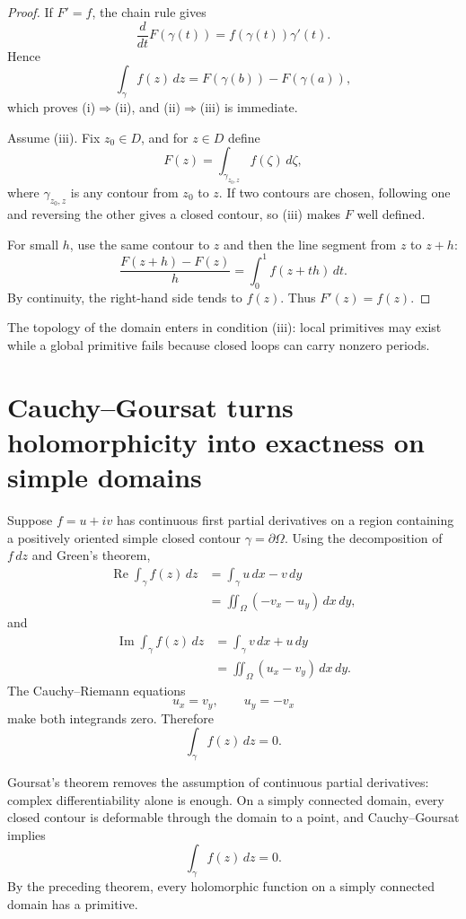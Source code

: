 \begin{proof}
If \(F'=f\), the chain rule gives
\[
  \frac{d}{dt}F(\gamma(t))
  =f(\gamma(t))\gamma'(t).
\]
Hence
\[
  \int_\gamma f(z)\,dz
  =F(\gamma(b))-F(\gamma(a)),
\]
which proves (i)\(\Rightarrow\)(ii), and (ii)\(\Rightarrow\)(iii) is immediate.

Assume (iii).  Fix \(z_0\in D\), and for \(z\in D\) define
\[
  F(z)=\int_{\gamma_{z_0,z}}f(\zeta)\,d\zeta,
\]
where \(\gamma_{z_0,z}\) is any contour from \(z_0\) to \(z\).  If two contours are chosen, following one and reversing the other gives a closed contour, so (iii) makes \(F\) well defined.

For small \(h\), use the same contour to \(z\) and then the line segment from \(z\) to \(z+h\):
\[
  \frac{F(z+h)-F(z)}{h}
  =\int_0^1 f(z+th)\,dt.
\]
By continuity, the right-hand side tends to \(f(z)\).  Thus \(F'(z)=f(z)\).
\end{proof}

The topology of the domain enters in condition (iii): local primitives may exist while a global primitive fails because closed loops can carry nonzero periods.

\section{Cauchy--Goursat turns holomorphicity into exactness on simple domains}

Suppose \(f=u+iv\) has continuous first partial derivatives on a region containing a positively oriented simple closed contour \(\gamma=\partial\Omega\).  Using the decomposition of \(f\,dz\) and Green's theorem,
\[
\begin{aligned}
  \operatorname{Re}\int_\gamma f(z)\,dz
  &=\int_\gamma u\,dx-v\,dy\\
  &=\iint_\Omega(-v_x-u_y)\,dx\,dy,
\end{aligned}
\]
and
\[
\begin{aligned}
  \operatorname{Im}\int_\gamma f(z)\,dz
  &=\int_\gamma v\,dx+u\,dy\\
  &=\iint_\Omega(u_x-v_y)\,dx\,dy.
\end{aligned}
\]
The Cauchy--Riemann equations
\[
  u_x=v_y,
  \qquad
  u_y=-v_x
\]
make both integrands zero.  Therefore
\[
  \int_\gamma f(z)\,dz=0.
\]

Goursat's theorem removes the assumption of continuous partial derivatives: complex differentiability alone is enough.  On a simply connected domain, every closed contour is deformable through the domain to a point, and Cauchy--Goursat implies
\[
  \int_\gamma f(z)\,dz=0.
\]
By the preceding theorem, every holomorphic function on a simply connected domain has a primitive.

